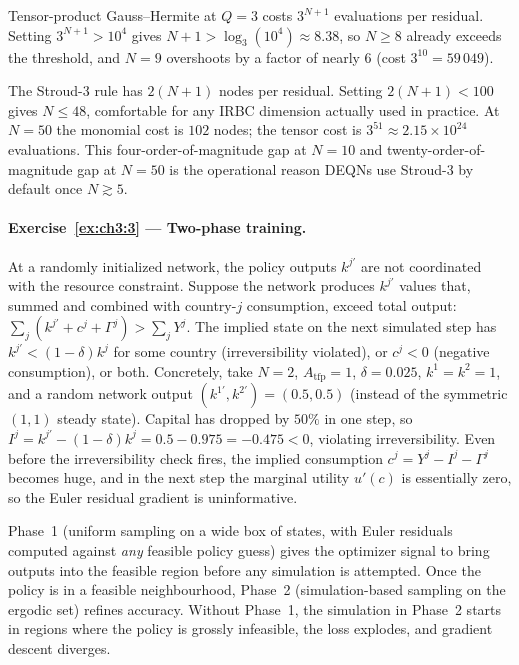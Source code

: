 \documentclass[11pt,a4paper]{report}
\begin{document}
Tensor-product Gauss--Hermite at $Q=3$ costs $3^{N+1}$ evaluations per residual.  Setting $3^{N+1} > 10^4$ gives $N + 1 > \log_3(10^4) \approx 8.38$, so $N \ge 8$ already exceeds the threshold, and $N = 9$ overshoots by a factor of nearly $6$ (cost $3^{10} = 59\,049$).

The Stroud-3 rule has $2(N+1)$ nodes per residual.  Setting $2(N+1) < 100$ gives $N \le 48$, comfortable for any IRBC dimension actually used in practice.  At $N = 50$ the monomial cost is $102$ nodes; the tensor cost is $3^{51} \approx 2.15 \times 10^{24}$ evaluations.  This four-order-of-magnitude gap at $N = 10$ and twenty-order-of-magnitude gap at $N = 50$ is the operational reason DEQNs use Stroud-3 by default once $N \gtrsim 5$.

\paragraph{Exercise~\ref{ex:ch3:3} --- Two-phase training.}
At a randomly initialized network, the policy outputs $k^{j\prime}$ are not coordinated with the resource constraint.  Suppose the network produces $k^{j\prime}$ values that, summed and combined with country-$j$ consumption, exceed total output: $\sum_j (k^{j\prime} + c^j + \Gamma^j) > \sum_j Y^j$.  The implied state on the next simulated step has $k^{j\prime} < (1-\delta) k^j$ for some country (irreversibility violated), or $c^j < 0$ (negative consumption), or both.  Concretely, take $N = 2$, $A_\mathrm{tfp} = 1$, $\delta = 0.025$, $k^1 = k^2 = 1$, and a random network output $(k^{1\prime}, k^{2\prime}) = (0.5, 0.5)$ (instead of the symmetric $(1, 1)$ steady state).  Capital has dropped by $50\%$ in one step, so $I^j = k^{j\prime} - (1-\delta)k^j = 0.5 - 0.975 = -0.475 < 0$, violating irreversibility.  Even before the irreversibility check fires, the implied consumption $c^j = Y^j - I^j - \Gamma^j$ becomes huge, and in the next step the marginal utility $u'(c)$ is essentially zero, so the Euler residual gradient is uninformative.

Phase~1 (uniform sampling on a wide box of states, with Euler residuals computed against \emph{any} feasible policy guess) gives the optimizer signal to bring outputs into the feasible region before any simulation is attempted.  Once the policy is in a feasible neighbourhood, Phase~2 (simulation-based sampling on the ergodic set) refines accuracy.  Without Phase~1, the simulation in Phase~2 starts in regions where the policy is grossly infeasible, the loss explodes, and gradient descent diverges.
\end{document}
